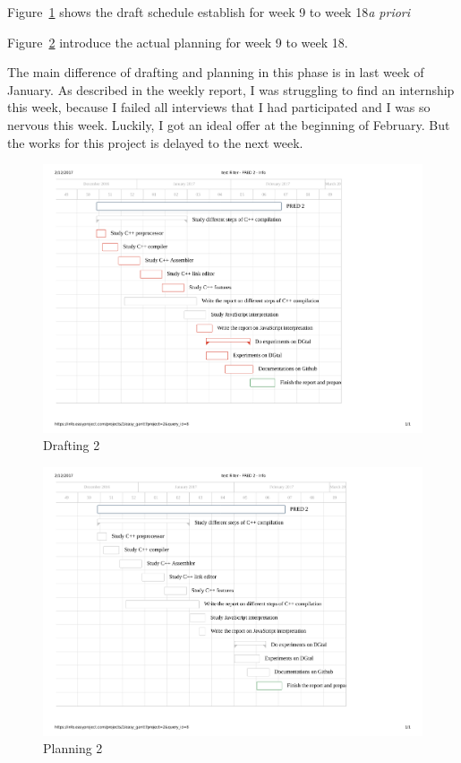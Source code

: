 Figure~\ref{fig:Drafting2} shows the draft schedule establish for week 9 to week 18\emph{a priori}


Figure~\ref{fig:Planning2} introduce the actual planning for week 9 to week 18.

The main difference of drafting and planning in this phase is in last week of January. As described in the weekly report, I was struggling to find an internship this week, because I failed all interviews that I had participated and I was so nervous this week. 
Luckily, I got an ideal offer at the beginning of February. But the works for this project is delayed to the next week.


\begin{figure}
   \centering
      \includegraphics[scale=0.6]{Images/Gantt3.pdf}
      \caption{Drafting 2}
   \label{fig:Drafting2}
\end{figure}


\begin{figure}
   \centering
      \includegraphics[scale=0.6]{Images/Gantt4.pdf}
      \caption{Planning 2}
   \label{fig:Planning2}
\end{figure}

